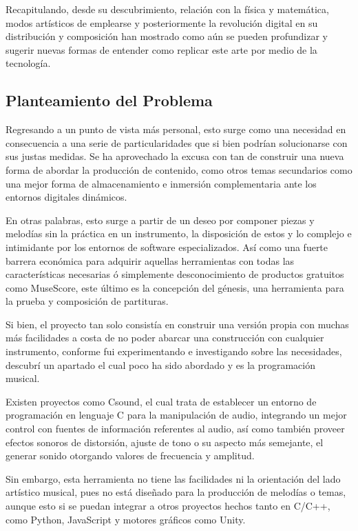 \documentclass{book}
\begin{document}
	Recapitulando, desde su descubrimiento, relación con la física y matemática, modos artísticos de emplearse y posteriormente la revolución digital en su distribución y composición han mostrado como aún se pueden profundizar y sugerir nuevas formas de entender como replicar este arte por medio de la tecnología.\par 
	\pagebreak\subsection*{Planteamiento del Problema}
	Regresando a un punto de vista más personal, esto surge como una necesidad en consecuencia a una serie de particularidades que si bien podrían solucionarse con sus justas medidas. Se ha aprovechado la excusa con tan de construir una nueva forma de abordar la producción de contenido, como otros temas secundarios como una mejor forma de almacenamiento e inmersión complementaria ante los entornos digitales dinámicos.\par 
	
	En otras palabras, esto surge a partir de un deseo por componer piezas y melodías sin la práctica en un instrumento, la disposición de estos y lo complejo e intimidante por los entornos de software especializados. Así como una fuerte barrera económica para adquirir aquellas herramientas con todas las características necesarias ó simplemente desconocimiento de productos gratuitos como MuseScore, este último es la concepción del génesis, una herramienta para la prueba y composición de partituras.\par
	
	Si bien, el proyecto tan solo consistía en construir una versión propia con muchas más facilidades a costa de no poder abarcar una construcción con cualquier instrumento, conforme fui experimentando e investigando sobre las necesidades, descubrí un apartado el cual poco ha sido abordado y es la programación musical.\par
	
	Existen proyectos como Csound, el cual trata de establecer un entorno de programación en lenguaje C para la manipulación de audio, integrando un mejor control con fuentes de información referentes al audio, así como también proveer efectos sonoros de distorsión, ajuste de tono o su aspecto más semejante, el generar sonido otorgando valores de frecuencia y amplitud.\par 
	
	Sin embargo, esta herramienta no tiene las facilidades ni la orientación del lado artístico musical, pues no está diseñado para la producción de melodías o temas, aunque esto si se puedan integrar a otros proyectos hechos tanto en C/C++, como Python, JavaScript y motores gráficos como Unity.\par 
	
\end{document}
